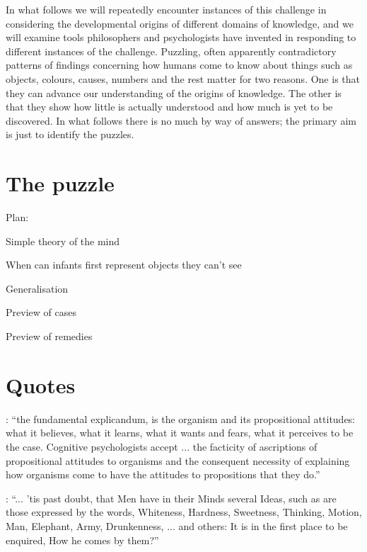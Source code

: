\documentclass[12pt,\papersize]{extarticle}
\begin{document}
In what follows we will repeatedly encounter instances of this challenge  in considering the developmental origins of different domains of knowledge, 
and we will examine tools philosophers and psychologists have invented in responding to different instances of the challenge.  
Puzzling, often apparently contradictory patterns of findings concerning how humans come to know about things such as objects, colours, causes, numbers and the rest matter for two reasons.
One is that they can advance our understanding of  the origins of knowledge.
The other is that they show how little is actually understood and how much is yet to be discovered.
In what follows there is no much by way of answers; the primary aim is just to identify the puzzles.




\section{The puzzle}
\label{sec:puzzle}

Plan:

Simple theory of the mind

When can infants first represent objects they can't see

Generalisation

Preview of cases

Preview of remedies


\section{Quotes}

\citep[p.\ 198]{Fodor:1975pb}: “the fundamental explicandum, is the organism and its propositional attitudes: what it believes, what it learns, what it wants and fears, what it perceives to be the case. Cognitive psychologists accept ... the facticity of ascriptions of propositional attitudes to organisms and the consequent necessity of explaining how organisms come to have the attitudes to propositions that they do.”

\citep[p.\ 104]{Locke:1975qo}: “... ’tis past doubt, that Men have in their Minds several Ideas, such as are those expressed by the words, Whiteness, Hardness, Sweetness, Thinking, Motion, Man, Elephant, Army, Drunkenness, ... and others: It is in the first place to be enquired, How he comes by them?”
\end{document}
